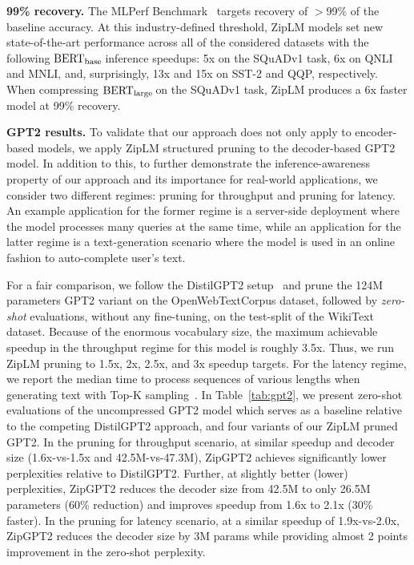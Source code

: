 \documentclass{article}
\newcommand{\bertbase}{$\textrm{BERT}_{\small{\textrm{base}}}\,$}
\newcommand{\bertlarge}{$\textrm{BERT}_{\small{\textrm{large}}}\,$}
\newcommand{\ourmethod}{ZipLM}
\theoremstyle{plain}
\theoremstyle{definition}
\theoremstyle{remark}
\renewcommand{\paragraph}[1]{ \noindent \textbf{#1}}
\begin{document}
\paragraph{99\% recovery.} The MLPerf Benchmark~\cite{mattson2020mlperf} targets recovery of $>$99\% of the baseline accuracy.
At this industry-defined threshold, \ourmethod{} models set new state-of-the-art performance across all of the considered datasets with the following \bertbase inference speedups: 5x on the SQuADv1 task, 6x on QNLI and MNLI, and, surprisingly, 13x and 15x on SST-2 and QQP, respectively. When compressing \bertlarge on the SQuADv1 task, \ourmethod{} produces a 6x faster model at 99\% recovery.

\paragraph{GPT2 results.} To validate that our approach does not only apply to encoder-based models, we apply \ourmethod{} structured pruning to the decoder-based GPT2 model. In addition to this, to further demonstrate the inference-awareness property of our approach and its importance for real-world applications, we consider two different regimes: pruning for throughput and pruning for latency. An example application for the former regime is a server-side deployment where the model processes many queries at the same time, while an application for the latter regime is a text-generation scenario where the model is used in an online fashion to auto-complete user's text.

For a fair comparison, we follow the DistilGPT2 setup~\citep{Sanh2019DistilBERTAD} and prune the 124M parameters GPT2 variant on the \mbox{OpenWebTextCorpus} dataset, followed by \textit{zero-shot} evaluations, without any fine-tuning, on the test-split of the WikiText~\citep{wikitext} dataset. Because of the enormous vocabulary size, the maximum achievable speedup in the throughput regime for this model is roughly 3.5x. Thus, we run \ourmethod{} pruning to 1.5x, 2x, 2.5x, and 3x speedup targets. For the latency regime, we report the median time to process sequences of various lengths when generating text with Top-K sampling~\cite{fan2018hierarchical}. In Table~\ref{tab:gpt2}, we present zero-shot evaluations of the uncompressed GPT2 model which serves as a baseline relative to the competing DistilGPT2 approach, and four variants of our \ourmethod{} pruned GPT2. In the pruning for throughput scenario, at similar speedup and decoder size (1.6x-vs-1.5x and 42.5M-vs-47.3M), ZipGPT2 achieves significantly lower perplexities relative to DistilGPT2. Further, at slightly better (lower) perplexities, ZipGPT2 reduces the decoder size from 42.5M to only 26.5M parameters (60\% reduction) and improves speedup from 1.6x to 2.1x (30\% faster). In the pruning for latency scenario, at a similar speedup of 1.9x-vs-2.0x, ZipGPT2 reduces the decoder size by 3M params while providing almost 2 points improvement in the zero-shot perplexity.
\end{document}
